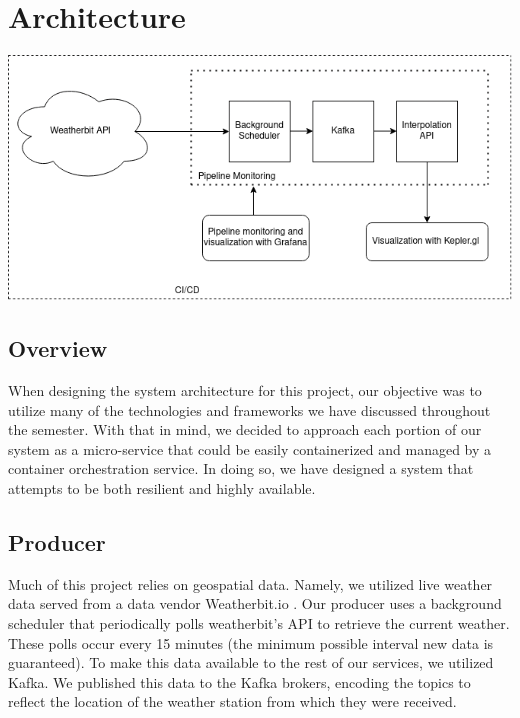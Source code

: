 \section{Architecture}
\includegraphics[width=\linewidth]{figures/architecture.png}
\subsection{Overview}
When designing the system architecture for this project, our objective was to utilize many of the technologies and frameworks we have discussed throughout the semester.
With that in mind, we decided to approach each portion of our system as a micro-service that could be easily containerized and managed by a container orchestration service.
In doing so, we have designed a system that attempts to be both resilient and highly available. 

\subsection{Producer}
Much of this project relies on geospatial data.
Namely, we utilized live weather data served from a data vendor Weatherbit.io \cite{weatherbit}.
Our producer uses a background scheduler that periodically polls weatherbit's API to retrieve the current weather.
These polls occur every 15 minutes (the minimum possible interval new data is guaranteed).
To make this data available to the rest of our services, we utilized Kafka.
We published this data to the Kafka brokers, encoding the topics to reflect the location of the weather station from which they were received.

